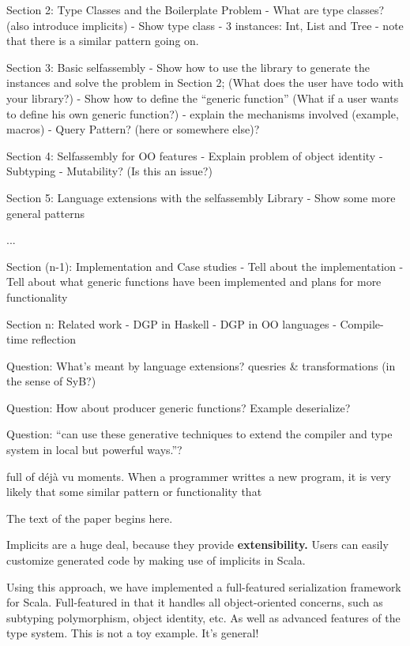 \documentclass[preprint]{sigplanconf}
\begin{document}
Section 2: Type Classes and the Boilerplate Problem
  - What are type classes? (also introduce implicits)
  - Show type class
  - 3 instances: Int, List and Tree
  - note that there is a similar pattern going on.

Section 3: Basic selfassembly
  - Show how to use the library to generate the instances and solve
  the problem in Section 2; (What does the user have todo with your library?)
  - Show how to define the ``generic function'' (What if a user wants to
  define his own generic function?)
  - explain the mechanisms involved (example, macros)
  - Query Pattern? (here or somewhere else)?

Section 4: Selfassembly for OO features
  - Explain problem of object identity
  - Subtyping
  - Mutability? (Is this an issue?)

Section 5: Language extensions with the selfassembly Library
  - Show some more general patterns

...

Section (n-1): Implementation and Case studies
  - Tell about the implementation
  - Tell about what generic functions have been implemented
     and plans for more functionality

Section n: Related work
   - DGP in Haskell
   - DGP in OO languages
   - Compile-time reflection

Question: What's meant by language extensions?
quesries \& transformations (in the sense of SyB?)

Question: How about producer generic functions? Example deserialize?

Question: ``can use these generative techniques to extend the compiler and type system in local but powerful ways.''?


full of d\'ej\`a vu moments. When a programmer writtes
a new program, it is very likely that some similar pattern or
functionality that

The text of the paper begins here.~\cite{ComparingGPHaskellRodriquez, ComparingGPHaskellHinze, ScalaGenericProgrammers, RepLib, OOGP}

Implicits are a huge deal, because they provide \textbf{extensibility.} Users can easily customize generated code by making use of implicits in Scala.

Using this approach, we have implemented a full-featured serialization framework for Scala. Full-featured in that it handles all object-oriented concerns, such as subtyping polymorphism, object identity, etc. As well as advanced features of the type system. This is not a toy example. It's general!
\end{document}
